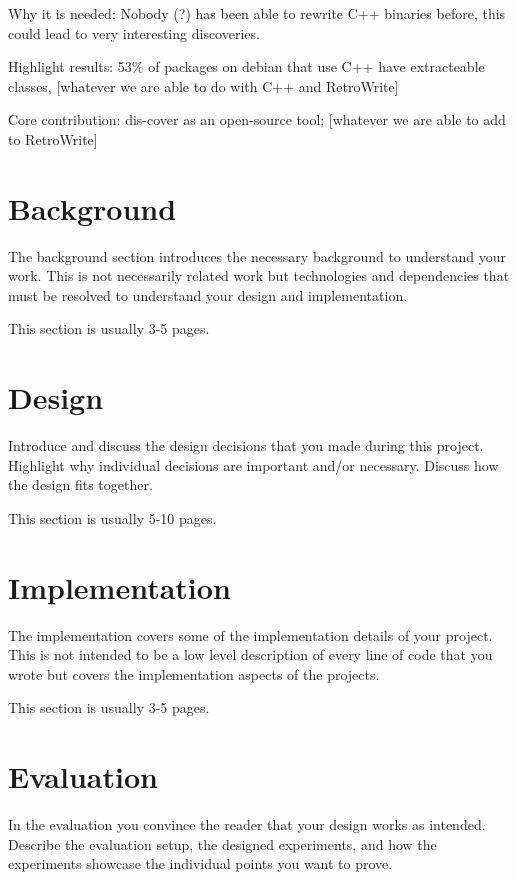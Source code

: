 \documentclass[a4paper,11pt,oneside]{report}
\begin{document}
Why it is needed: Nobody (?) has been able to rewrite C++ binaries before, this could lead to very interesting discoveries.

Highlight results: 53\% of packages on debian that use C++ have extracteable classes, [whatever we are able to do with C++ and RetroWrite]

Core contribution: dis-cover as an open-source tool; [whatever we are able to add to RetroWrite]

\chapter{Background}

The background section introduces the necessary background to understand your
work. This is not necessarily related work but technologies and dependencies
that must be resolved to understand your design and implementation.

This section is usually 3-5 pages.


\chapter{Design}

Introduce and discuss the design decisions that you made during this project.
Highlight why individual decisions are important and/or necessary. Discuss
how the design fits together.

This section is usually 5-10 pages.


\chapter{Implementation}

The implementation covers some of the implementation details of your project.
This is not intended to be a low level description of every line of code that
you wrote but covers the implementation aspects of the projects.

This section is usually 3-5 pages.


\chapter{Evaluation}

In the evaluation you convince the reader that your design works as intended.
Describe the evaluation setup, the designed experiments, and how the
experiments showcase the individual points you want to prove.
\end{document}
